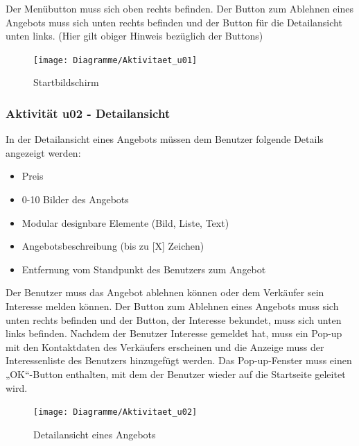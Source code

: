 \documentclass[a4paper,12pt,oneside]{scrartcl}
\begin{document}
Der Menübutton muss sich oben rechts befinden.
Der Button zum Ablehnen eines Angebots muss sich unten rechts befinden und der Button für die Detailansicht unten links.
(Hier gilt obiger Hinweis bezüglich der Buttons)

\begin{figure}[!htbp]
\centering
\noindent\texttt{[image: Diagramme/Aktivitaet\_u01]}
\caption{Startbildschirm}
\end{figure}
\FloatBarrier


\hypertarget{u02}{\subsubsection{Aktivität u02 - Detailansicht}}
In der Detailansicht eines Angebots müssen dem Benutzer folgende Details angezeigt werden:
\begin{itemize}
	\item Preis
	\item 0-10 Bilder des Angebots
	\item Modular designbare Elemente (Bild, Liste, Text)
	\item Angebotsbeschreibung (bis zu [X] Zeichen)
	\item Entfernung vom Standpunkt des Benutzers zum Angebot
\end{itemize}
Der Benutzer muss das Angebot ablehnen können oder dem Verkäufer sein Interesse melden können.
Der Button zum Ablehnen eines Angebots muss sich unten rechts befinden und der Button, der Interesse bekundet, muss sich unten links befinden.
Nachdem der Benutzer Interesse gemeldet hat, muss ein Pop-up mit den Kontaktdaten des Verkäufers erscheinen und die Anzeige muss der Interessenliste des Benutzers hinzugefügt werden.
Das Pop-up-Fenster muss einen „OK“-Button enthalten, mit dem der Benutzer wieder auf die Startseite geleitet wird.

\begin{figure}[!htbp]
\centering
\noindent\texttt{[image: Diagramme/Aktivitaet\_u02]}
\caption{Detailansicht eines Angebots}
\end{figure}
\FloatBarrier
\end{document}
